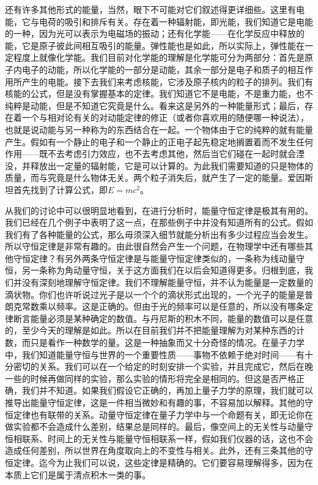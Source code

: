 还有许多其他形式的能量，当然，眼下不可能对它们叙述得更详细些。这里有电能，它与电荷的吸引和排斥有关。存在着一种辐射能，即光能，我们知道它是电能的一种，因为光可以表示为电磁场的振动；还有化学能——在化学反应中释放的能，它是原子彼此间相互吸引的能量。弹性能也是如此，所以实际上，弹性能在一定程度上就像化学能。我们目前对化学能的理解是化学能可分为两部分：首先是原子内电子的动能，所以化学能的一部分是动能，其余一部分是电子和质子的相互作用所产生的电能。接下去我们来考虑核能，它涉及原子核内的粒子的排列。我们有核能的公式，但是没有掌握基本的定律。我们知道它不是电能，不是重力能，也不纯粹是动能，但是不知道它究竟是什么。看来这是另外的一种能量形式；最后，存在着一个与相对论有关的对动能定律的修正（或者你喜欢用的随便哪一种说法），也就是说动能与另一种称为的东西结合在一起。一个物体由于它的纯粹的就有能量产生。假如有一个静止的电子和一个静止的正电子起先稳定地搁置着而不发生任何作用——既不去考虑引力效应，也不去考虑其他，然后当它们碰在一起时就会湮没，并释放出一定量的辐射能，它是可以计算的。为此我们需要知道的只是物体的质量，而与究竟是什么物体无关。两个粒子消失后，就产生了一定的能量。爱因斯坦首先找到了计算公式，即$ E=mc^2 $。

从我们的讨论中可以很明显地看到，在进行分析时，能量守恒定律是极其有用的。我们已经在几个例子中表明了这一点，在那些例子中并没有知道所有的公式。假如我们有了各种能量的公式，那么毋须深入细节就能分析出有多少过程应当会发生。所以守恒定律是非常有趣的。由此很自然会产生一个问题，在物理学中还有哪些其他守恒定律？有另外两条守恒定律是与能量守恒定律类似的，一条称为线动量守恒，另一条称为角动量守恒，关于这方面我们在以后会知道得更多。归根到底，我们并没有深刻地理解守恒定律。我们不理解能量守恒，并不认为能量是一定数量的滴状物。你们也许听说过光子是以一个个的滴状形式出现的，一个光子的能量是普朗克常数乘以频率。这是正确的。但由于光的频率可以是任意的，所以没有哪条定律断言能量必须是某种确定的数值。与丹尼斯的积木不同，能量的数值可以是任意的，至少今天的理解是如此。所以在目前我们并不把能量理解为对某种东西的计数，而只是看作一种数学的量。这是一种抽象而又十分奇怪的情况。在量子力学中，我们知道能量守恒与世界的一个重要性质——事物不依赖于绝对时间——有十分密切的关系。我们可以在一个给定的时刻安排一个实验，并且完成它，然后在晚一些的时候再做同样的实验，那么实验的情形将完全是相同的。但这是否严格正确，我们并不知道。如果我们假设它正确的，再加上量子力学的原理，我们就可以推导出能量守恒定律，这是一件相当微妙和有趣的事，不容易加以解释。其他的守恒定律也有联带的关系。动量守恒定律在量子力学中与一个命题有关，即无论你在做实验都不会造成什么差别，结果总是同样的。最后，像空间上的无关性与动量守恒相联系、时间上的无关性与能量守恒相联系一样，假如我们仪器的话，这也不会造成任何差别，所以世界在角度取向上的不变性与相关。此外，还有三条其他的守恒定律。迄今为止我们可以说，这些定律是精确的。它们要容易理解得多，因为在本质上它们是属于清点积木一类的事。

